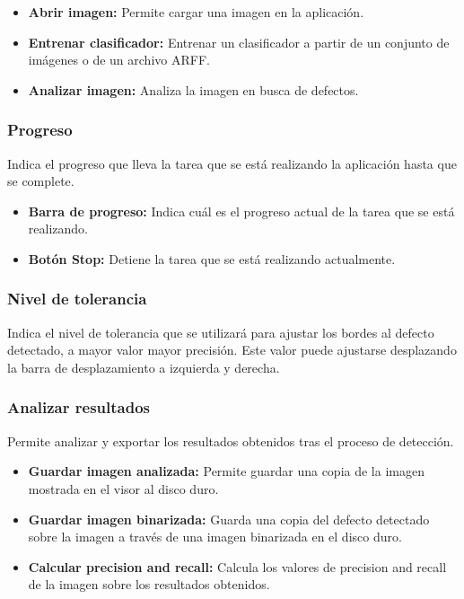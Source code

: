 \begin{itemize}
\item \textbf{Abrir imagen:} Permite cargar una imagen en la aplicación.
\item \textbf{Entrenar clasificador:} Entrenar un clasificador a partir de un conjunto de imágenes o de un archivo ARFF.
\item \textbf{Analizar imagen:} Analiza la imagen en busca de defectos.
\end{itemize}


\subsubsection*{Progreso}
Indica el progreso que lleva la tarea que se está realizando la aplicación hasta que se complete.

\begin{itemize}
\item \textbf{Barra de progreso:} Indica cuál es el progreso actual de la tarea que se está realizando.
\item \textbf{Botón Stop:} Detiene la tarea que se está realizando actualmente.
\end{itemize}


\subsubsection*{Nivel de tolerancia}
Indica el nivel de tolerancia que se utilizará para ajustar los bordes al defecto detectado, a mayor valor mayor precisión. Este valor puede ajustarse desplazando la barra de desplazamiento a izquierda y derecha.


\subsubsection*{Analizar resultados}
Permite analizar y exportar los resultados obtenidos tras el proceso de detección.

\begin{itemize}
\item \textbf{Guardar imagen analizada:} Permite guardar una copia de la imagen mostrada en el visor al disco duro.
\item \textbf{Guardar imagen binarizada:} Guarda una copia del defecto detectado sobre la imagen a través de una imagen binarizada en el disco duro.
\item \textbf{Calcular precision and recall:} Calcula los valores de precision and recall de la imagen sobre los resultados obtenidos.
\end{itemize}

